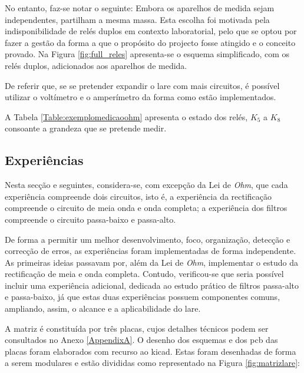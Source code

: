 No entanto, faz-se notar o seguinte: Embora os aparelhos de medida sejam independentes, partilham a mesma massa. Esta escolha foi motivada pela indisponibilidade de relés duplos em contexto laboratorial, pelo que se optou por fazer a gestão da forma a que o propósito do projecto fosse atingido e o conceito provado. Na Figura \ref{fig:full_reles} apresenta-se o esquema simplificado, com os relés duplos, adicionados aos aparelhos de medida. 

De referir que, se se pretender expandir o \acrshort{lare} com mais circuitos, é possível utilizar o voltímetro e o amperímetro da forma como estão implementados. 

A Tabela \ref{Table:exemplomedicaoohm} apresenta o estado dos relés, $K_{5}$ a $K_{8}$ consoante a grandeza que se pretende medir.

\subsection{Experiências}
\label{sec:experiencias}
Nesta secção e seguintes, considera-se, com excepção da Lei de \textit{Ohm}, que cada experiência compreende dois circuitos, isto é, a experiência da rectificação compreende o circuito de meia onda e onda completa; a experiência dos filtros compreende o circuito passa-baixo e passa-alto.

De forma a permitir um melhor desenvolvimento, foco, organização, detecção e correcção de erros, as experiências foram implementadas de forma independente. As primeiras ideias passavam por, além da Lei de \textit{Ohm}, implementar o estudo da rectificação de meia e onda completa. Contudo, verificou-se que seria possível incluir uma experiência adicional, dedicada ao estudo prático de filtros passa-alto e passa-baixo, já que estas duas experiências possuem componentes comuns, ampliando, assim, o alcance e a aplicabilidade do \acrshort{lare}.

A matriz é constituída por três placas, cujos detalhes técnicos podem ser consultados no Anexo \ref{AppendixA}. 
O desenho dos esquemas  e dos \acrfull{pcb} das placas foram elaborados com recurso ao \gls{kicad}. Estas foram desenhadas de forma a serem modulares e estão divididas como representado na Figura \ref{fig:matrizlare}:

